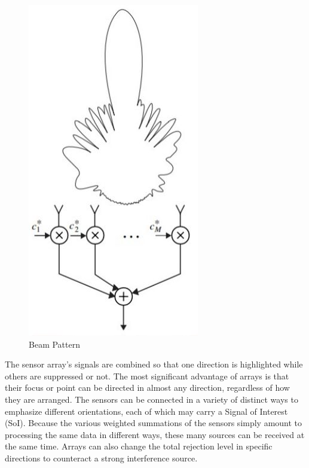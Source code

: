 \begin{figure}[h]
\centering
\includegraphics[scale=1]{Chapter2/Figures/idea}		
\caption{ \label{fig:idea}Beam Pattern}
\end{figure}

The sensor array's signals are combined so that one direction is highlighted while others are suppressed or not. The most significant advantage of arrays is that their focus or point can be directed in almost any direction, regardless of how they are arranged. The sensors can be connected in a variety of distinct ways to emphasize different orientations, each of which may carry a Signal of Interest (SoI). Because the various weighted summations of the sensors simply amount to processing the same data in different ways, these many sources can be received at the same time. Arrays can also change the total rejection level in specific directions to counteract a strong interference source.

